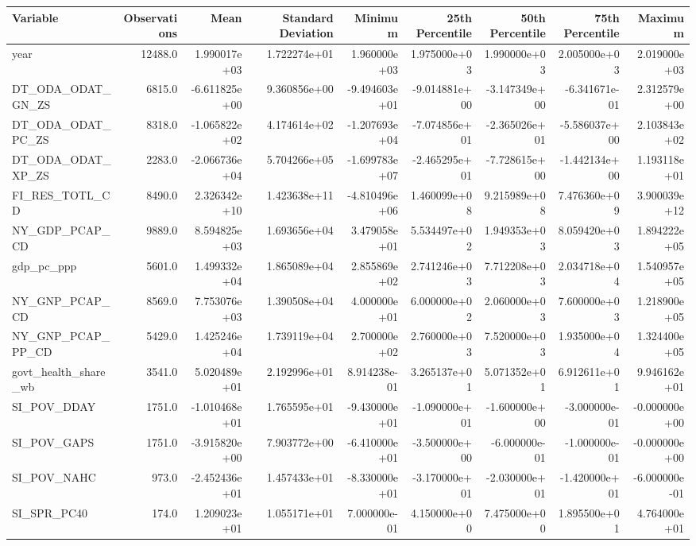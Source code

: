 \begin{tabular}{lrrrrrrrr}
\toprule
              Variable &  Observations &          Mean &  Standard Deviation &       Minimum &  25th Percentile &  50th Percentile &  75th Percentile &       Maximum \\
\midrule
year & 12488.0 & 1.990017e+03 & 1.722274e+01 & 1.960000e+03 & 1.975000e+03 & 1.990000e+03 & 2.005000e+03 & 2.019000e+03 \\
DT\_ODA\_ODAT\_GN\_ZS & 6815.0 & -6.611825e+00 & 9.360856e+00 & -9.494603e+01 & -9.014881e+00 & -3.147349e+00 & -6.341671e-01 & 2.312579e+00 \\
DT\_ODA\_ODAT\_PC\_ZS & 8318.0 & -1.065822e+02 & 4.174614e+02 & -1.207693e+04 & -7.074856e+01 & -2.365026e+01 & -5.586037e+00 & 2.103843e+02 \\
DT\_ODA\_ODAT\_XP\_ZS & 2283.0 & -2.066736e+04 & 5.704266e+05 & -1.699783e+07 & -2.465295e+01 & -7.728615e+00 & -1.442134e+00 & 1.193118e+01 \\
FI\_RES\_TOTL\_CD & 8490.0 & 2.326342e+10 & 1.423638e+11 & -4.810496e+06 & 1.460099e+08 & 9.215989e+08 & 7.476360e+09 & 3.900039e+12 \\
NY\_GDP\_PCAP\_CD & 9889.0 & 8.594825e+03 & 1.693656e+04 & 3.479058e+01 & 5.534497e+02 & 1.949353e+03 & 8.059420e+03 & 1.894222e+05 \\
gdp\_pc\_ppp & 5601.0 & 1.499332e+04 & 1.865089e+04 & 2.855869e+02 & 2.741246e+03 & 7.712208e+03 & 2.034718e+04 & 1.540957e+05 \\
NY\_GNP\_PCAP\_CD & 8569.0 & 7.753076e+03 & 1.390508e+04 & 4.000000e+01 & 6.000000e+02 & 2.060000e+03 & 7.600000e+03 & 1.218900e+05 \\
NY\_GNP\_PCAP\_PP\_CD & 5429.0 & 1.425246e+04 & 1.739119e+04 & 2.700000e+02 & 2.760000e+03 & 7.520000e+03 & 1.935000e+04 & 1.324400e+05 \\
govt\_health\_share\_wb & 3541.0 & 5.020489e+01 & 2.192996e+01 & 8.914238e-01 & 3.265137e+01 & 5.071352e+01 & 6.912611e+01 & 9.946162e+01 \\
SI\_POV\_DDAY & 1751.0 & -1.010468e+01 & 1.765595e+01 & -9.430000e+01 & -1.090000e+01 & -1.600000e+00 & -3.000000e-01 & -0.000000e+00 \\
SI\_POV\_GAPS & 1751.0 & -3.915820e+00 & 7.903772e+00 & -6.410000e+01 & -3.500000e+00 & -6.000000e-01 & -1.000000e-01 & -0.000000e+00 \\
SI\_POV\_NAHC & 973.0 & -2.452436e+01 & 1.457433e+01 & -8.330000e+01 & -3.170000e+01 & -2.030000e+01 & -1.420000e+01 & -6.000000e-01 \\
SI\_SPR\_PC40 & 174.0 & 1.209023e+01 & 1.055171e+01 & 7.000000e-01 & 4.150000e+00 & 7.475000e+00 & 1.895500e+01 & 4.764000e+01 \\

\end{tabular}
